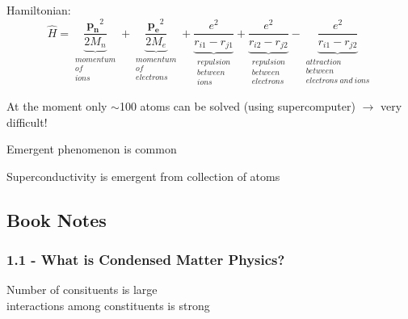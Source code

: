 \documentclass[english, 11pt]{article}
\begin{document}
		Hamiltonian:
		\begin{equation*}
				\hat{H} = \underbrace{\frac{\mathbf{p_n}^2}{2 M_n}}_{\substack{momentum\\of\\ions}} + 
							\underbrace{\frac{\mathbf{p_e}^2}{2 M_e}}_{\substack{momentum\\of\\electrons}} +
							\underbrace{\frac{e^2}{r_{i1}-r_{j1}}}_{\substack{repulsion\\between\\ions}}  + 
							\underbrace{\frac{e^2}{r_{i2}-r_{j2}}}_{\substack{repulsion\\between\\electrons}}  -
							\underbrace{\frac{e^2}{r_{i1}-r_{j2}}}_{\substack{attraction\\between\\electrons\ and\ ions}}
		\end{equation*}
		
		At the moment only $\sim$100 atoms can be solved (using supercomputer) $\rightarrow$ very difficult! \\
		\begin{description}
			\item Emergent phenomenon is common
			\begin{description}
				\item Superconductivity is emergent from collection of atoms
			\end{description}
		\end{description}

		\subsection{Book Notes}
			\subsubsection{1.1 - What is Condensed Matter Physics?}
				\begin{description}
					\item[Number of consituents is large]
					\item[interactions among constituents is strong]
				\end{description}
\end{document}
